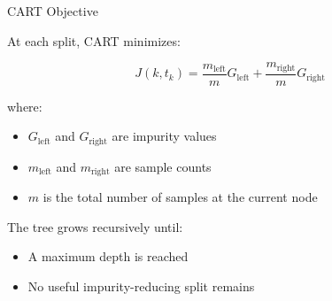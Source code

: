 \documentclass[aspectratio=169]{beamer}
\begin{document}
\begin{frame}{CART Objective}
	
	At each split, CART minimizes:
	
	\[
	J(k,t_k)
	=
	\frac{m_{\text{left}}}{m}G_{\text{left}}
	+
	\frac{m_{\text{right}}}{m}G_{\text{right}}
	\]
	
	\vspace{0.5em}
	
	where:
	
	\begin{itemize}
		\item $G_{\text{left}}$ and $G_{\text{right}}$ are impurity values
		\item $m_{\text{left}}$ and $m_{\text{right}}$ are sample counts
		\item $m$ is the total number of samples at the current node
	\end{itemize}
	
	\vspace{0.5em}
	
	The tree grows recursively until:
	
	\begin{itemize}
		\item A maximum depth is reached
		\item No useful impurity-reducing split remains
	\end{itemize}
	
\end{frame}

\end{document}
